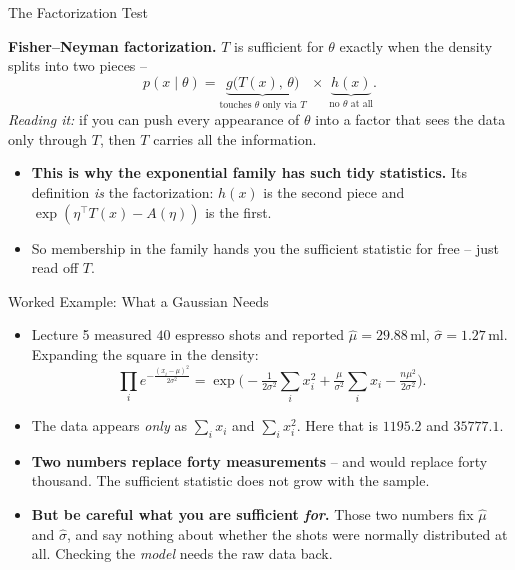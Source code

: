 \begin{frame}{The Factorization Test}
\begin{rldefinition}
\textbf{Fisher--Neyman factorization.} $T$ is sufficient for $\theta$ exactly when the density splits into two pieces --
\[
p(x \mid \theta) = \underbrace{g\big(T(x),\, \theta\big)}_{\text{touches } \theta \text{ only via } T} \;\times\; \underbrace{h(x)}_{\text{no } \theta \text{ at all}} .
\]
\emph{Reading it:} if you can push every appearance of $\theta$ into a factor that sees the data only through $T$, then $T$ carries all the information.
\end{rldefinition}
\pause
\begin{itemize}
  \item \textbf{This is why the exponential family has such tidy statistics.} Its definition \emph{is} the factorization: $h(x)$ is the second piece and $\exp(\eta^{\top}T(x) - A(\eta))$ is the first.
  \pause
  \item So membership in the family hands you the sufficient statistic for free -- just read off $T$.
\end{itemize}
\end{frame}

\begin{frame}{Worked Example: What a Gaussian Needs}
\begin{itemize}
  \item Lecture 5 measured $40$ espresso shots and reported $\hat{\mu} = 29.88$\,ml, $\hat{\sigma} = 1.27$\,ml. Expanding the square in the density:
  \[
    \prod_i e^{-\frac{(x_i-\mu)^2}{2\sigma^2}}
    = \exp\Big( -\tfrac{1}{2\sigma^2}\textstyle\sum_i x_i^{2} + \tfrac{\mu}{\sigma^{2}}\sum_i x_i - \tfrac{n\mu^{2}}{2\sigma^{2}} \Big).
  \]
  \pause
  \item The data appears \emph{only} as $\sum_i x_i$ and $\sum_i x_i^{2}$. Here that is $1195.2$ and $35777.1$.
  \pause
  \item \textbf{Two numbers replace forty measurements} -- and would replace forty thousand. The sufficient statistic does not grow with the sample.
  \pause
  \item \textbf{But be careful what you are sufficient \emph{for}.} Those two numbers fix $\hat{\mu}$ and $\hat{\sigma}$, and say nothing about whether the shots were normally distributed at all. Checking the \emph{model} needs the raw data back.
\end{itemize}
\end{frame}

